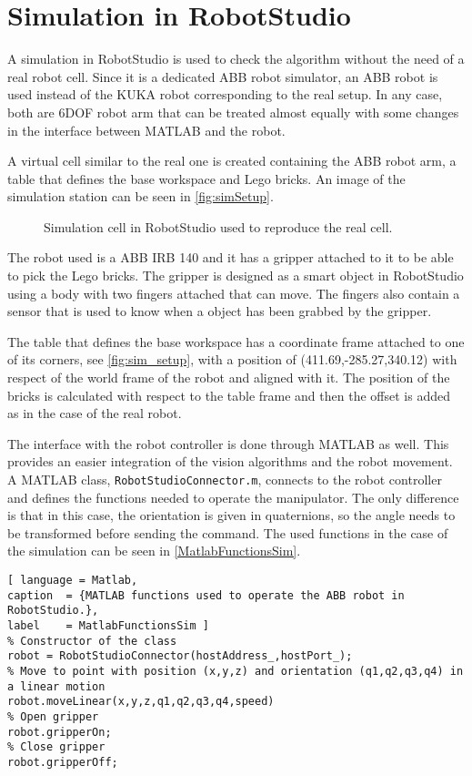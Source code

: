 \chapter{Simulation in RobotStudio}\label{chap:simulation}
A simulation in RobotStudio \cite{robotStudio} is used to check the algorithm without the need of a real robot cell. Since it is a dedicated ABB robot simulator, an ABB robot is used instead of the KUKA robot corresponding to the real setup. In any case, both are 6DOF robot arm that can be treated almost equally with some changes in the interface between MATLAB and the robot. 

A virtual cell similar to the real one is created containing the ABB robot arm, a table that defines the base workspace and Lego bricks. An image of the simulation station can be seen in \autoref{fig:simSetup}.
\begin{figure}[H]
    \caption{Simulation cell in RobotStudio used to reproduce the real cell.}
    \label{fig:simSetup}
\end{figure}

The robot used is a ABB IRB 140 \cite{abb} and it has a gripper attached to it to be able to pick the Lego bricks. The gripper is designed as a smart object in RobotStudio using a body with two fingers attached that can move. The fingers also contain a sensor that is used to know when a object has been grabbed by the gripper.

The table that defines the base workspace has a coordinate frame attached to one of its corners, see \autoref{fig:sim_setup}, with a position of (411.69,-285.27,340.12) with respect of the world frame of the robot and aligned with it. The position of the bricks is calculated with respect to the table frame and then the offset is added as in the case of the real robot.

The interface with the robot controller is done through MATLAB as well. This provides an easier integration of the vision algorithms and the robot movement. A MATLAB class, \lstinline[style=matlabinline]{RobotStudioConnector.m}, connects to the robot controller and defines the functions needed to operate the manipulator. The only difference is that in this case, the orientation is given in quaternions, so the angle needs to be transformed before sending the command. The used functions in the case of the simulation can be seen in \autoref{MatlabFunctionsSim}.

\begin{lstlisting}[ language = Matlab,
caption  = {MATLAB functions used to operate the ABB robot in RobotStudio.},
label    = MatlabFunctionsSim ]
% Constructor of the class
robot = RobotStudioConnector(hostAddress_,hostPort_);
% Move to point with position (x,y,z) and orientation (q1,q2,q3,q4) in a linear motion
robot.moveLinear(x,y,z,q1,q2,q3,q4,speed)
% Open gripper
robot.gripperOn;
% Close gripper
robot.gripperOff;
\end{lstlisting}

